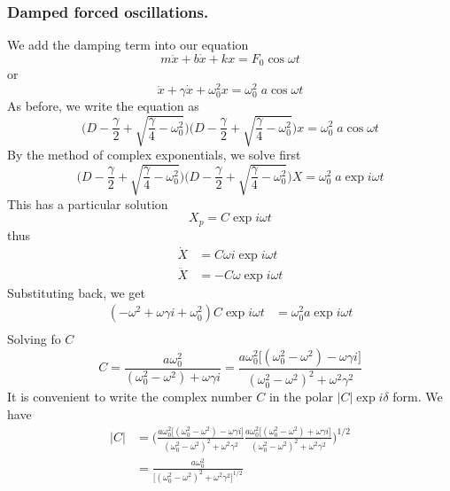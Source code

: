 \documentclass[../../main.tex]{subfiles}
\begin{document}
\subsubsection{Damped forced oscillations.} We add the damping term into our equation
\begin{equation*}
    m\ddot{x}+b\dot{x}+kx=F_0 \cos \omega t
\end{equation*}
or
\begin{equation*}
    \ddot{x}+\gamma\dot{x}+\omega_0^2x=\omega_0^2\;a \cos \omega t
\end{equation*}
As before, we write the equation as 
\begin{equation*}
    \biggl(D-\frac{\gamma}{2}+\sqrt{\frac{\gamma}{4}-\omega_0^2}\biggr)\biggl(D-\frac{\gamma}{2}+\sqrt{\frac{\gamma}{4}-\omega_0^2}\biggr)x=\omega_0^2\;a \cos \omega t
\end{equation*}
By the method of complex exponentials, we solve first
\begin{equation*}
    \biggl(D-\frac{\gamma}{2}+\sqrt{\frac{\gamma}{4}-\omega_0^2}\biggr)\biggl(D-\frac{\gamma}{2}+\sqrt{\frac{\gamma}{4}-\omega_0^2}\biggr)X=\omega_0^2\;a \exp i\omega t
\end{equation*}
This has a particular solution
\begin{equation*}
    X_p=C\exp i\omega t
\end{equation*}
thus 
\begin{align*}
    \dot{X}&=C\omega i \exp i\omega t\\
    \ddot{X}&=-C\omega \exp i\omega t
\end{align*}
Substituting back, we get
\begin{align*}
    (-\omega^2+\omega \gamma i+\omega_0^2)C\exp{i\omega t}&=\omega_0^2a\exp{i\omega t}\\
\end{align*}
Solving fo $C$
\begin{equation*}
    C=\frac{a\omega_0^2}{(\omega_0^2-\omega^2)+\omega\gamma i}= \frac{a\omega_0^2 \big[(\omega_0^2-\omega^2)-\omega\gamma i\big]}{(\omega_0^2- \omega^2)^2 +\omega^2\gamma^2 }
\end{equation*}
It is convenient to write the complex number $C$ in the polar $|C|\exp i \delta$ form. We have
\begin{align*}
    |C|&=\Biggl( \frac{a\omega_0^2 \big[(\omega_0^2-\omega^2)-\omega\gamma i\big]}{(\omega_0^2- \omega^2)^2 +\omega^2\gamma^2 } \frac{a\omega_0^2 \big[(\omega_0^2-\omega^2)+\omega\gamma i\big]}{(\omega_0^2- \omega^2)^2 +\omega^2\gamma^2 }\Biggr)^{1/2}\\
    &= \frac{a\omega_0^2 }{\big[(\omega_0^2- \omega^2)^2 +\omega^2\gamma^2\big]^{1/2} }
\end{align*}
\end{document}
